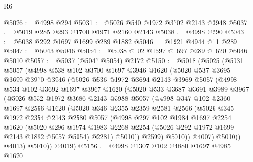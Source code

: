 \begin{lexlean}{R6}
\begin{coremodule}
@5026 := @4998 @294
@5031 := @5026 @540 @1972 @3702 @2143 @3948
@5037 := @5019 @285 @293 @1700 @1971 @2160 @2143
@5038 := @4998 @290
@5043 := @5038 @292 @1697 @1699 @289 @1882
@5046 := @1921 @4944 @11 @289
@5047 := @5043 @5046
@5054 := @5038 @102 @1697 @1697 @289 @1620 @5046 @5010
@5057 := @5037 (@5047 @5054) @2172
@5150 := @5018
    (@5025
      (@5031
        @5057
        (@4998
          @538
          @102
          @3700
          @1697
          @3946
          @1620
          (@5020
            @537
            @3695
            @3699
            @3970
            @3946
            (@5026
              @536
              @1972
              @3694
              @2143
              @3969
              @5057
              (@4998
                @534
                @102
                @3692
                @1697
                @3967
                @1620
                (@5020
                  @533
                  @3687
                  @3691
                  @3989
                  @3967
                  (@5026
                    @532
                    @1972
                    @3686
                    @2143
                    @3988
                    @5057
                    (@4998
                      @347
                      @102
                      @2360
                      @1697
                      @2566
                      @1620
                      (@5020
                        @346
                        @2355
                        @2359
                        @2581
                        @2566
                        (@5026
                          @345
                          @1972
                          @2354
                          @2143
                          @2580
                          @5057
                          (@4998
                            @297
                            @102
                            @1984
                            @1697
                            @2254
                            @1620
                            (@5020
                              @296
                              @1974
                              @1983
                              @2268
                              @2254
                              (@5026 @292 @1972 @1699 @2143 @1882 @5057 @5054)
                              @2281)
                            @5010))
                        @2599)
                      @5010))
                  @4007)
                @5010))
            @4013)
          @5010))
      @4019)
@5156 := @4998 @1307 @102 @4880 @1697 @4985 @1620

\end{coremodule}
\end{lexlean}
